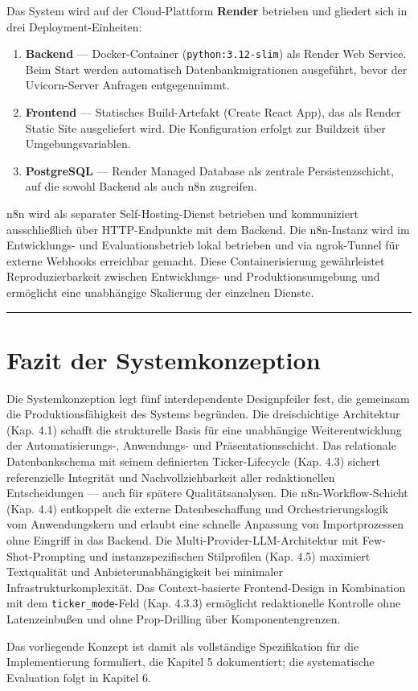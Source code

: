 Das System wird auf der Cloud-Plattform \textbf{Render} betrieben und
gliedert sich in drei Deployment-Einheiten:

\begin{enumerate}
\def\labelenumi{\arabic{enumi}.}
\tightlist
\item
  \textbf{Backend} --- Docker-Container (\texttt{python:3.12-slim}) als
  Render Web Service. Beim Start werden automatisch Datenbankmigrationen
  ausgeführt, bevor der Uvicorn-Server Anfragen entgegennimmt.
\item
  \textbf{Frontend} --- Statisches Build-Artefakt (Create React App),
  das als Render Static Site ausgeliefert wird. Die Konfiguration
  erfolgt zur Buildzeit über Umgebungsvariablen.
\item
  \textbf{PostgreSQL} --- Render Managed Database als zentrale
  Persistenzschicht, auf die sowohl Backend als auch n8n zugreifen.
\end{enumerate}

n8n wird als separater Self-Hosting-Dienst betrieben und kommuniziert
ausschließlich über HTTP-Endpunkte mit dem Backend. Die n8n-Instanz wird
im Entwicklungs- und Evaluationsbetrieb lokal betrieben und via
ngrok-Tunnel für externe Webhooks erreichbar gemacht. Diese
Containerisierung gewährleistet Reproduzierbarkeit zwischen
Entwicklungs- und Produktionsumgebung und ermöglicht eine unabhängige
Skalierung der einzelnen Dienste.

\begin{center}\rule{0.5\linewidth}{0.5pt}\end{center}

\section{Fazit der
Systemkonzeption}\label{fazit-der-systemkonzeption}

Die Systemkonzeption legt fünf interdependente Designpfeiler fest, die
gemeinsam die Produktionsfähigkeit des Systems begründen. Die
dreischichtige Architektur (Kap. 4.1) schafft die strukturelle Basis für
eine unabhängige Weiterentwicklung der Automatisierungs-, Anwendungs-
und Präsentationsschicht. Das relationale Datenbankschema mit seinem
definierten Ticker-Lifecycle (Kap. 4.3) sichert referenzielle Integrität
und Nachvollziehbarkeit aller redaktionellen Entscheidungen --- auch für
spätere Qualitätsanalysen. Die n8n-Workflow-Schicht (Kap. 4.4)
entkoppelt die externe Datenbeschaffung und Orchestrierungslogik vom
Anwendungskern und erlaubt eine schnelle Anpassung von Importprozessen
ohne Eingriff in das Backend. Die Multi-Provider-LLM-Architektur mit
Few-Shot-Prompting und instanzspezifischen Stilprofilen (Kap. 4.5)
maximiert Textqualität und Anbieterunabhängigkeit bei minimaler
Infrastrukturkomplexität. Das Context-basierte Frontend-Design in
Kombination mit dem \texttt{ticker\_mode}-Feld (Kap. 4.3.3) ermöglicht
redaktionelle Kontrolle ohne Latenzeinbußen und ohne Prop-Drilling über
Komponentengrenzen.

Das vorliegende Konzept ist damit als vollständige Spezifikation für die
Implementierung formuliert, die Kapitel 5 dokumentiert; die
systematische Evaluation folgt in Kapitel 6.
